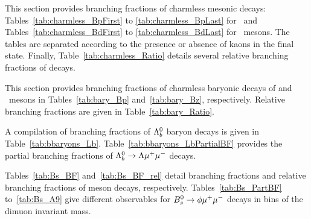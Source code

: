 \label{sec:rare-charmless}

This section provides branching fractions of charmless mesonic decays:
Tables~\ref{tab:charmless_BpFirst} to \ref{tab:charmless_BpLast} for \Bp\
and Tables~\ref{tab:charmless_BdFirst} to
\ref{tab:charmless_BdLast}
for \Bz\ mesons.
The tables are separated according to the presence or absence of kaons in the final state. 
Finally, Table~\ref{tab:charmless_Ratio} details several relative branching fractions of \Bz decays.


\vspace{-0.8cm}


\label{sec:rare-bary}

This section provides branching fractions of charmless baryonic decays of \Bz and \Bp\ mesons in Tables~\ref{tab:bary_Bp} and~\ref{tab:bary_Bz}, respectively. Relative branching fractions are given in Table~\ref{tab:bary_Ratio}.


\clearpage


\label{sec:rare-lb}

A compilation of branching fractions of $\Lambda_b^0$ baryon decays is given in Table~\ref{tab:bbaryons_Lb}. Table~\ref{tab:bbaryons_LbPartialBF} provides the partial branching fractions of $\Lambda_b^0\to\Lambda\mu^+\mu^-$ decays.



\clearpage

\label{sec:rare-bs}

Tables~\ref{tab:Bs_BF} and~\ref{tab:Bs_BF_rel} detail branching fractions and relative branching fractions of \Bs meson decays, respectively. Tables~\ref{tab:Bs_PartBF} to~\ref{tab:Bs_A9} give different observables for $B^0_s\to\phi\mu^+\mu^-$ decays in bins of the dimuon invariant mass.



\clearpage

\label{sec:rare-radll}

